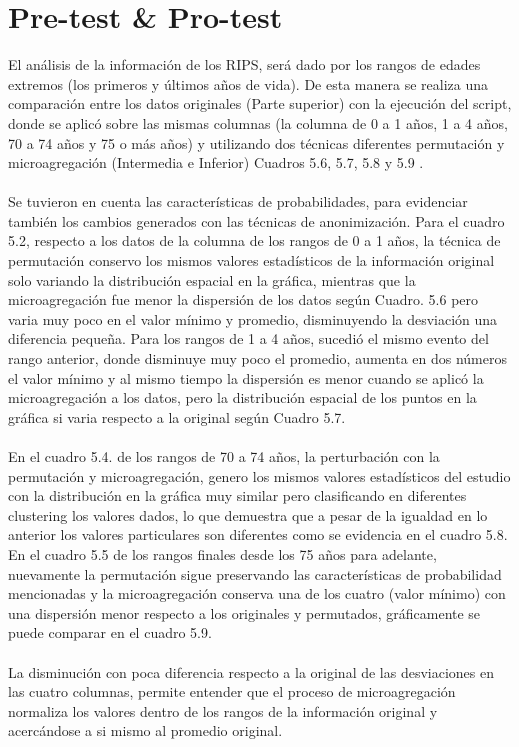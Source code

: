 \documentclass[a4paper,openright,12pt]{book}
\theoremstyle{definition}
\theoremstyle{remark}
\begin{document}
\section{Pre-test \& Pro-test}
El análisis de la información de los RIPS, será dado por los rangos de edades extremos (los primeros y últimos años de vida). De esta manera se realiza una comparación entre  los datos originales (Parte superior) con la ejecución del script, donde se aplicó sobre las mismas columnas (la columna de 0 a 1 años, 1 a 4 años, 70 a 74 años y 75 o más años) y utilizando dos técnicas diferentes permutación y microagregación (Intermedia e Inferior) Cuadros 5.6, 5.7, 5.8 y 5.9 .\\\\Se tuvieron en cuenta las características de probabilidades, para evidenciar también los cambios generados con las técnicas de anonimización. Para el cuadro 5.2, respecto a los datos de la columna de los rangos de 0 a 1 años, la técnica de permutación conservo los mismos valores estadísticos de la información original solo variando la distribución espacial en la gráfica, mientras que la microagregación fue menor la dispersión de los datos según Cuadro. 5.6 pero varia muy poco en el valor mínimo y promedio, disminuyendo la desviación una diferencia pequeña. Para los rangos de 1 a 4 años, sucedió el mismo evento del rango anterior, donde disminuye muy poco el promedio, aumenta en dos números el valor mínimo y al mismo tiempo la dispersión es menor cuando se aplicó la microagregación a los datos, pero la distribución espacial de los puntos en la gráfica si varia respecto a la original según Cuadro 5.7.\\\\ En el cuadro 5.4. de los rangos de 70 a 74 años, la perturbación con la permutación y microagregación, genero los mismos valores estadísticos del estudio con la distribución en la gráfica muy similar pero clasificando en diferentes clustering los valores dados, lo que demuestra que a pesar de la igualdad en lo anterior los valores particulares son diferentes como se evidencia en el cuadro 5.8. En el cuadro 5.5 de los rangos finales desde los 75 años para adelante, nuevamente la permutación sigue preservando las características de probabilidad mencionadas y la microagregación conserva una de los cuatro (valor mínimo) con una dispersión menor respecto a los originales y permutados, gráficamente se puede comparar en el cuadro 5.9.\\\\La disminución con poca diferencia respecto a la original de las desviaciones en las cuatro columnas, permite entender que el proceso de microagregación normaliza los valores dentro de los rangos de la información original y acercándose a si mismo al promedio original.  
\end{document}
